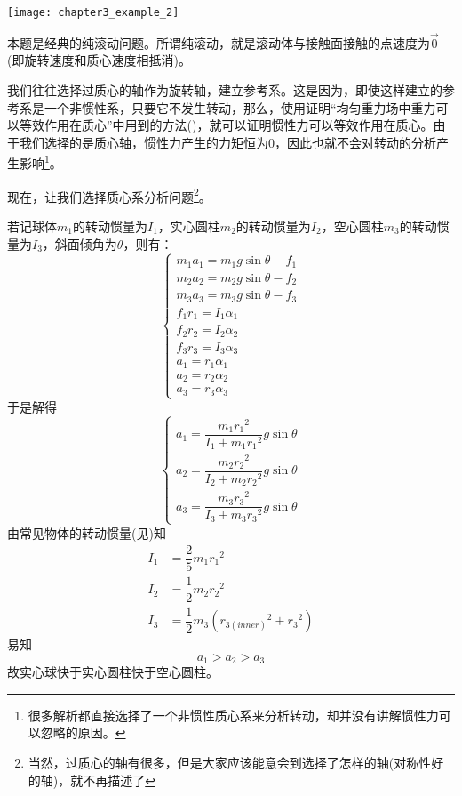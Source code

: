 \begin{solution}
	\begin{center}
		\texttt{[image: chapter3\_example\_2]}
	\end{center}
	
	本题是经典的纯滚动问题。所谓纯滚动，就是滚动体与接触面接触的点速度为$\vec{0}$(即旋转速度和质心速度相抵消)。
	
	我们往往选择过质心的轴作为旋转轴，建立参考系。这是因为，即使这样建立的参考系是一个非惯性系，只要它不发生转动，那么，使用证明“均匀重力场中重力可以等效作用在质心”中用到的方法()，就可以证明惯性力可以等效作用在质心。由于我们选择的是质心轴，惯性力产生的力矩恒为$0$，因此也就不会对转动的分析产生影响\footnote{很多解析都直接选择了一个非惯性质心系来分析转动，却并没有讲解惯性力可以忽略的原因。}。
	
	现在，让我们选择质心系分析问题\footnote{当然，过质心的轴有很多，但是大家应该能意会到选择了怎样的轴(对称性好的轴)，就不再描述了}。
	
	若记球体$m_1$的转动惯量为$I_1$，实心圆柱$m_2$的转动惯量为$I_2$，空心圆柱$m_3$的转动惯量为$I_3$，斜面倾角为$\theta$，则有：
	\[\left\{
		\begin{array}{l}
			m_1a_1=m_1g\sin\theta-f_1\\
			m_2a_2=m_2g\sin\theta-f_2\\
			m_3a_3=m_3g\sin\theta-f_3\\
			 f_1r_1=I_1\alpha_1\\
			 f_2r_2=I_2\alpha_2\\
			 f_3r_3=I_3\alpha_3\\
			a_1=r_1\alpha_1\\
			a_2=r_2\alpha_2\\
			a_3=r_3\alpha_3
		\end{array}
	\right.\]
	于是解得
	\[\left\{
		\begin{array}{l}
			a_1=\dfrac{m_1r_1{}^2}{I_1+m_1r_1{}^2}g\sin\theta\\[2ex]
			a_2=\dfrac{m_2r_2{}^2}{I_2+m_2r_2{}^2}g\sin\theta\\[2ex]
			a_3=\dfrac{m_3r_3{}^2}{I_3+m_3r_3{}^2}g\sin\theta
		\end{array}
	\right.\]
	由常见物体的转动惯量(见)知
	\begin{align*}
		I_1&=\dfrac{2}{5}m_1r_1{}^2\\
		I_2&=\dfrac{1}{2}m_2r_2{}^2\\
		I_3&=\dfrac{1}{2}m_3(r_{3(inner)}{}^2+r_3{}^2)
	\end{align*}
	易知
	\[a_1>a_2>a_3\]
	故实心球快于实心圆柱快于空心圆柱。
\end{solution}
